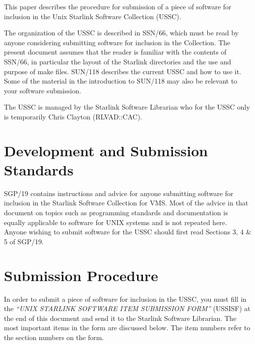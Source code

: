 This paper describes the procedure for submission of a piece of 
software for inclusion in the Unix Starlink Software Collection (USSC).

The organization of the USSC is described
in SSN/66, which must be read by anyone considering submitting
software for inclusion in the Collection. The present document assumes that
the reader is familiar with the contents of SSN/66, in particular the
layout of the Starlink directories and the use and purpose of make files.
SUN/118 describes the current USSC and how to use it. Some of the material in
the introduction to SUN/118 may also be relevant to your software submission.

The USSC is managed by the Starlink Software Librarian who for the USSC only
is temporarily Chris Clayton (RLVAD::CAC).

\section {Development and Submission Standards}

SGP/19 contains instructions and advice for anyone submitting software for
inclusion in the Starlink Software Collection for VMS. Most of the advice in
that document on topics such as programming standards and documentation is
equally applicable to software for UNIX systems and is not repeated here.
Anyone wishing to submit software for the USSC should first read Sections 3, 4
\& 5 of SGP/19.

\section{Submission Procedure}

In order to submit a piece of software for inclusion in the USSC, you must fill
in the {\em ``UNIX STARLINK SOFTWARE ITEM SUBMISSION FORM''\/} (USSISF) at the
end of this document and send it to the Starlink Software Librarian. The most
important items in the form are discussed below. The item numbers refer to the
section numbers on  the form.

